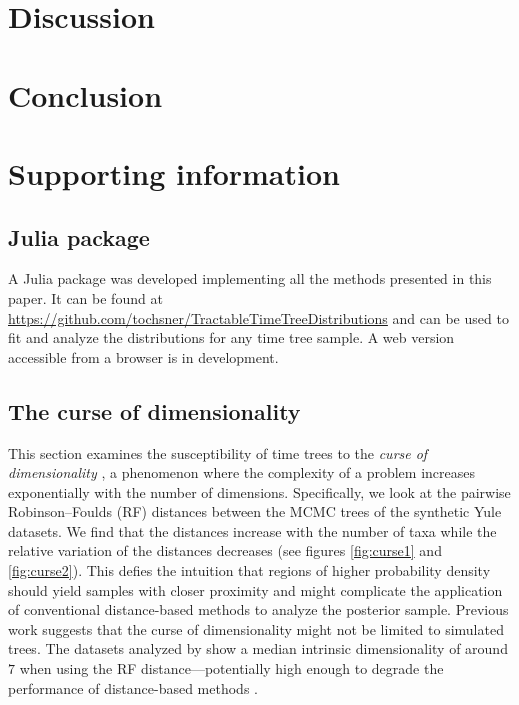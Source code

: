\documentclass[10pt,letterpaper]{article}
\begin{document}
\section*{Discussion}

\section*{Conclusion}

\section*{Supporting information}

\subsection*{Julia package}

A Julia package \cite{juliapackage} was developed implementing all the methods presented in this paper. It can be found at \url{https://github.com/tochsner/TractableTimeTreeDistributions} and can be used to fit and analyze the distributions for any time tree sample. A web version accessible from a browser is in development.

\subsection*{The curse of dimensionality}

This section examines the susceptibility of time trees to the \emph{curse of dimensionality} \cite{curse,curse2}, a phenomenon where the complexity of a problem increases exponentially with the number of dimensions. Specifically, we look at the pairwise Robinson–Foulds (RF) distances between the MCMC trees of the synthetic Yule datasets. We find that the distances increase with the number of taxa while the relative variation of the distances decreases (see figures \ref{fig:curse1} and \ref{fig:curse2}). This defies the intuition that regions of higher probability density should yield samples with closer proximity and might complicate the application of conventional distance-based methods to analyze the posterior sample. Previous work suggests that the curse of dimensionality might not be limited to simulated trees. The datasets analyzed by \cite{dimensionality} show a median intrinsic dimensionality of around $7$ when using the RF distance---potentially high enough to degrade the performance of distance-based methods \cite{curseimplications}.
\end{document}
